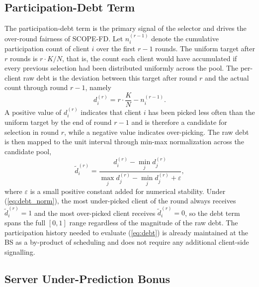\documentclass[journal]{IEEEtran}
\begin{document}
\subsection{Participation-Debt Term}
\label{ssec:debt-term}

The participation-debt term is the primary signal of the selector and drives the over-round fairness of SCOPE-FD. Let $n_i^{(r-1)}$ denote the cumulative participation count of client $i$ over the first $r-1$ rounds. The uniform target after $r$ rounds is $r\cdot K/N$, that is, the count each client would have accumulated if every previous selection had been distributed uniformly across the pool. The per-client raw debt is the deviation between this target after round $r$ and the actual count through round $r-1$, namely
\begin{equation}
d_i^{(r)} = r\cdot \frac{K}{N} - n_i^{(r-1)}.
\label{eq:debt}
\end{equation}
A positive value of $d_i^{(r)}$ indicates that client $i$ has been picked less often than the uniform target by the end of round $r-1$ and is therefore a candidate for selection in round $r$, while a negative value indicates over-picking. The raw debt is then mapped to the unit interval through min-max normalization across the candidate pool,
\begin{equation}
\tilde{d}_i^{(r)} = \frac{d_i^{(r)} - \min_j d_j^{(r)}}{\max_j d_j^{(r)} - \min_j d_j^{(r)} + \varepsilon},
\label{eq:debt_norm}
\end{equation}
where $\varepsilon$ is a small positive constant added for numerical stability. Under (\ref{eq:debt_norm}), the most under-picked client of the round always receives $\tilde{d}_i^{(r)} = 1$ and the most over-picked client receives $\tilde{d}_i^{(r)} = 0$, so the debt term spans the full $[0,1]$ range regardless of the magnitude of the raw debt. The participation history needed to evaluate (\ref{eq:debt}) is already maintained at the BS as a by-product of scheduling and does not require any additional client-side signalling.

\subsection{Server Under-Prediction Bonus}
\label{ssec:bonus-term}
\end{document}

